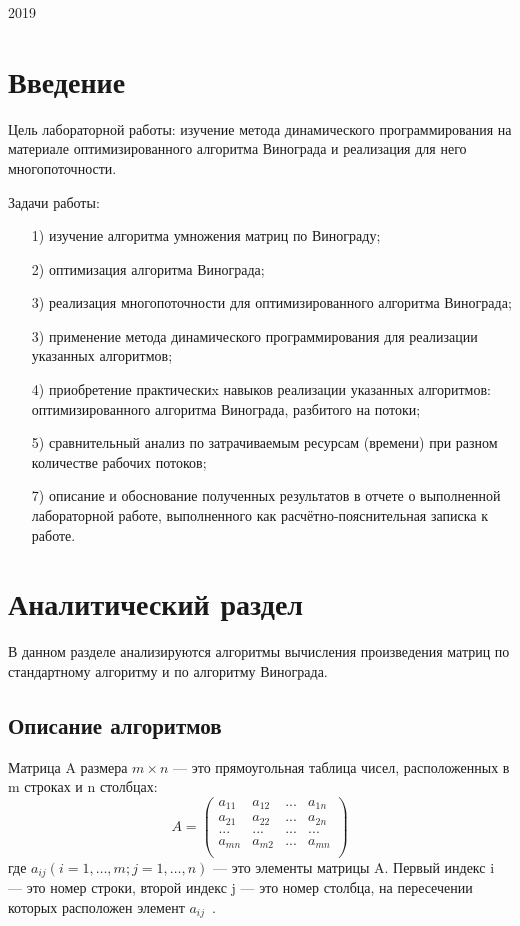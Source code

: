 \documentclass[a4paper,14pt]{article}
\begin{document}
\vspace*{40mm}
\begin{center}
2019    
\end{center}
\thispagestyle{empty}
\pagebreak


\tableofcontents
\pagebreak


\section*{Введение}

Цель лабораторной работы: изучение метода динамического программирования на материале оптимизированного алгоритма Винограда и реализация для него многопоточности.

Задачи работы:
\begin{enumerate} 
	\item[1)] изучение алгоритма умножения матриц по Винограду;
	\item[2)] оптимизация алгоритма Винограда;
	\item[3)] реализация многопоточности для оптимизированного алгоритма Винограда;
	\item[3)] применение метода динамического программирования для реализации указанных алгоритмов;
	\item[4)] приобретение практическиx навыков реализации указанных алгоритмов: оптимизированного алгоритма Винограда, разбитого на потоки;
	\item[5)] сравнительный анализ по затрачиваемым ресурсам (времени) при разном количестве рабочих потоков;
	\item[7)] описание и обоснование полученных результатов в отчете о выполненной лабораторной работе, выполненного как расчётно-пояснительная записка к работе. 
\end{enumerate} 
\pagebreak



\section{Аналитический раздел}
	
	В данном разделе анализируются алгоритмы вычисления произведения матриц по стандартному алгоритму и по алгоритму Винограда. 
	
 
	
	\subsection{Описание алгоритмов}
	Матрица A размера $m \times n$ — это прямоугольная таблица чисел, расположенных в m строках и n столбцах:
	\[A = \begin{pmatrix}
a_{11} & a_{12} & ... & a_{1n}\\
a_{21} & a_{22} & ... & a_{2n}\\
... & ... & ... & ...\\
a_{mn} & a_{m2} & ... & a_{mn}\\
\end{pmatrix} \]
 где $a_{ij} (i = 1, …, m; j =1, …, n)$ — это элементы матрицы A. Первый индекс i — это номер строки, второй индекс j — это номер столбца, на пересечении которых расположен элемент $a_{ij}$~\cite{matr}.
		    
\end{document}
